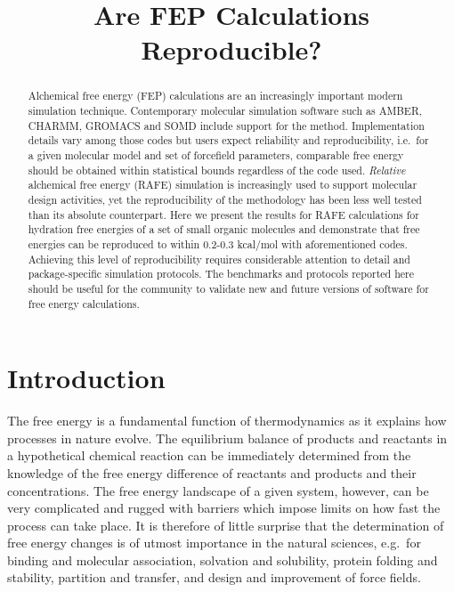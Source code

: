 \documentclass[journal=jctcce,manuscript=article]{achemso}
\title{Are FEP Calculations Reproducible?}
\begin{document}
\begin{abstract}
  Alchemical free energy (FEP) calculations are an increasingly important modern simulation technique.  Contemporary molecular simulation software such as AMBER, CHARMM, GROMACS and SOMD include support for the method. Implementation details vary among those codes but users expect reliability and reproducibility, i.e.\ for a given molecular model and set of forcefield parameters, comparable free energy should be obtained within statistical bounds regardless of the code used.  \emph{Relative} alchemical free energy (RAFE) simulation is increasingly used to support molecular design activities, yet the reproducibility of the methodology has been less well tested than its absolute counterpart. Here we present the results for RAFE calculations for hydration free energies of a set of small 
  organic molecules and demonstrate that free energies can be reproduced to within 0.2-0.3 kcal/mol with aforementioned codes. Achieving this level of reproducibility requires considerable attention to detail and package-specific simulation protocols. The benchmarks and protocols reported here should be useful for the community to validate new and future versions of software for free energy calculations.
\end{abstract}

\begin{tocentry}
\end{tocentry}


\section{Introduction}
\label{sec:intro}

The free energy is a fundamental function of thermodynamics as it explains 
how processes in nature evolve.  The equilibrium balance of products and reactants in a hypothetical chemical reaction can be immediately determined
from the knowledge of the free energy difference of reactants and
products and their concentrations.  The free energy landscape of a given 
system, however, can be very complicated and rugged with barriers which impose
limits on how fast the process can take place.  It is therefore of
little surprise that the determination of free energy changes is of
utmost importance in the natural sciences, e.g.\ for binding and
molecular association, solvation and solubility, protein folding and
stability, partition and transfer, and design and improvement of force
fields. 
\end{document}
